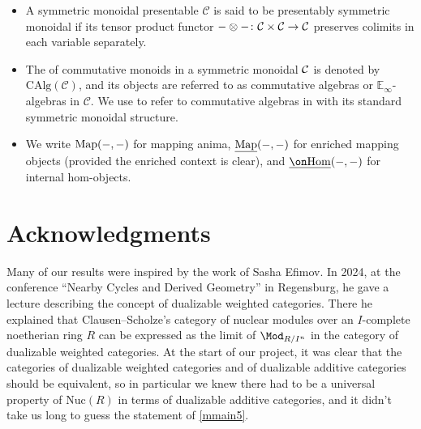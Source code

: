 \documentclass[a4paper,10pt, oneside]{amsart}
\begin{document}
\begin{itemize}
	
	\item A symmetric monoidal presentable \infcat $\mathcal{C}$ is said to be presentably symmetric monoidal if its tensor product functor $- \otimes - \colon \mathcal{C} \times \mathcal{C} \to \mathcal{C}$ preserves colimits in each variable separately.
	
	\item The \infcat of commutative monoids in a symmetric monoidal \infcat $\mathcal{C}$ is denoted by $\mathrm{CAlg}(\mathcal{C})$, and its objects are referred to as commutative algebras or $\mathbb{E}_{\infty}$-algebras in $\mathcal{C}$. 
	We use \einfrings to refer to commutative algebras in \opsp with its standard symmetric monoidal structure.
	
	\item We write $\operatorname{Map}(-,-)$ for mapping anima, $\underline{\operatorname{Map}}(-,-)$ for enriched mapping objects (provided the enriched context is clear), and $\underline{\Hom}(-,-)$ for internal hom-objects.

\end{itemize}

	

\section*{Acknowledgments}

Many of our results were inspired by the work of Sasha Efimov. In 2024, at the conference ``Nearby Cycles and Derived Geometry'' in Regensburg, he gave a lecture describing the concept of dualizable weighted 
categories. 
There he explained that Clausen--Scholze's category of nuclear modules over an $I$-complete noetherian ring $R$ can be expressed as the limit of $\Mod_{R/I^n}$ in the category of dualizable weighted 
categories. At the start of our project, it was clear that the categories of dualizable weighted categories and of dualizable additive categories should be equivalent, so in particular we knew there had to be 
a universal property of $\mathrm{Nuc}(R)$ in terms of dualizable additive categories, and it didn't take us long to guess the statement of \cref{mmain5}. 
\end{document}
